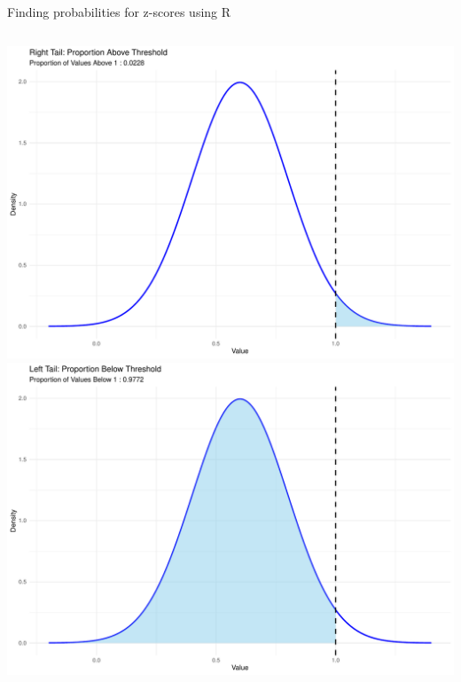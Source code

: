 \documentclass[
  ignorenonframetext,
]{beamer}
\begin{document}
\begin{frame}{Finding probabilities for z-scores using R}
\begin{columns}[T]
\begin{column}{0.5\textwidth}
\includegraphics{M5-Hypothesis-Testing,-Probability-and-Distribution_files/figure-beamer/unnamed-chunk-17-1.pdf}
\includegraphics{M5-Hypothesis-Testing,-Probability-and-Distribution_files/figure-beamer/unnamed-chunk-17-2.pdf}
\end{column}
\end{columns}
\end{frame}
\end{document}
